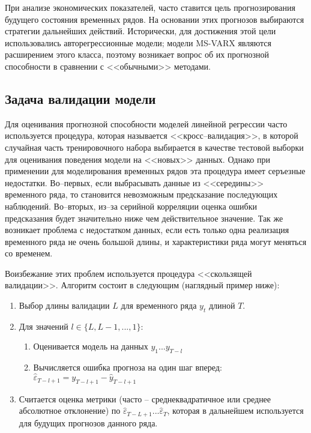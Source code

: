 \documentclass[a4paper,14pt]{extreport}
\begin{document}
	При анализе экономических показателей, часто ставится цель прогнозирования будущего состояния временных рядов. На основании этих прогнозов выбираются стратегии дальнейших действий. Исторически, для достижения этой цели использовались авторегрессионные модели; модели MS-VARX являются расширением этого класса, поэтому возникает вопрос об их прогнозной способности в сравнении с <<обычными>> методами.
	
	\subsection{Задача валидации модели}
	
	Для оценивания прогнозной способности моделей линейной регрессии часто используется процедура, которая называется <<кросс--валидация>>, в которой случайная часть тренировочного набора выбирается в качестве тестовой выборки для оценивания поведения модели на <<новых>> данных. Однако при применении для моделирования временных рядов эта процедура имеет серъезные недостатки. Во--первых, если выбрасывать данные из <<середины>> временного ряда, то становится невозможным предсказание последующих наблюдений. Во--вторых, из--за серийной корреляции оценка ошибки предсказания будет значительно ниже чем действительное значение. Так же возникает проблема с недостатком данных, если есть только одна реализация временного ряда не очень большой длины, и характеристики ряда могут меняться со временем.
	
	Воизбежание этих проблем используется процедура <<скользящей валидации>>. Алгоритм состоит в следующим (наглядный пример ниже):
	\begin{enumerate}
		\item Выбор длины валидации $L$ для временного ряда  $y_t$ длиной $T$.
		\item Для значений $l \in \{L, L-1, ..., 1\}$:
		\begin{enumerate}
			\item Оценивается модель на данных $y_1 ... y_{T-l}$
			\item Вычисляется ошибка прогноза на один шаг вперед: 
			$\hat{\varepsilon}_{T-l+1} = y_{T-l+1} - \hat{y}_{T-l+1}$
		\end{enumerate}
		\item Считается оценка метрики (часто -- среднеквадратичное или среднее абсолютное отклонение) по $\hat{\varepsilon}_{T-L+1} ... \hat{\varepsilon}_{T}$, которая в дальнейшем используется для будущих прогнозов данного ряда.
	\end{enumerate}
	
\end{document}
